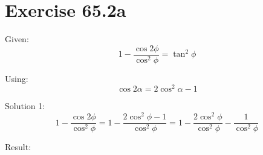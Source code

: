\documentclass[a4paper, 10pt]{scrartcl}
\begin{document}
\section{Exercise 65.2a}

Given:
\[1 - \frac{\cos{2\phi}}{\cos^{2}{\phi}} = \tan^{2}{\phi}\]

Using:
\[\cos{2\alpha} = 2\cos^{2}{\alpha} - 1\]

Solution 1:
\[1 - \frac{\cos{2\phi}}{\cos^{2}{\phi}} = 1 - \frac{2\cos^{2}{\phi} - 1}{\cos^{2}{\phi}} =
1 - \frac{2\cos^{2}{\phi}}{\cos^{2}{\phi}} - \frac{1}{\cos^{2}{\phi}}
\]

Result:
\end{document}
